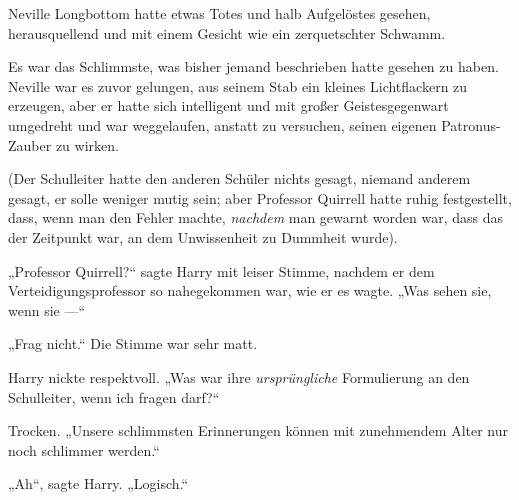 \later

Neville Longbottom hatte etwas Totes und halb Aufgelöstes gesehen, herausquellend und mit einem Gesicht wie ein zerquetschter Schwamm.

Es war das Schlimmste, was bisher jemand beschrieben hatte gesehen zu haben. Neville war es zuvor gelungen, aus seinem Stab ein kleines Lichtflackern zu erzeugen, aber er hatte sich intelligent und mit großer Geistesgegenwart umgedreht und war weggelaufen, anstatt zu versuchen, seinen eigenen Patronus-Zauber zu wirken.

(Der Schulleiter hatte den anderen Schüler nichts gesagt, niemand anderem gesagt, er solle weniger mutig sein; aber Professor Quirrell hatte ruhig festgestellt, dass, wenn man den Fehler machte, \emph{nachdem} man gewarnt worden war, dass das der Zeitpunkt war, an dem Unwissenheit zu Dummheit wurde).

„Professor Quirrell?“ sagte Harry mit leiser Stimme, nachdem er dem Verteidigungsprofessor so nahegekommen war, wie er es wagte.
„Was sehen sie, wenn sie —“

„Frag nicht.“ Die Stimme war sehr matt.

Harry nickte respektvoll.
„Was war ihre \emph{ursprüngliche} Formulierung an den Schulleiter, wenn ich fragen darf?“

Trocken.
„Unsere schlimmsten Erinnerungen können mit zunehmendem Alter nur noch schlimmer werden.“

„Ah“, sagte Harry.
„Logisch.“

